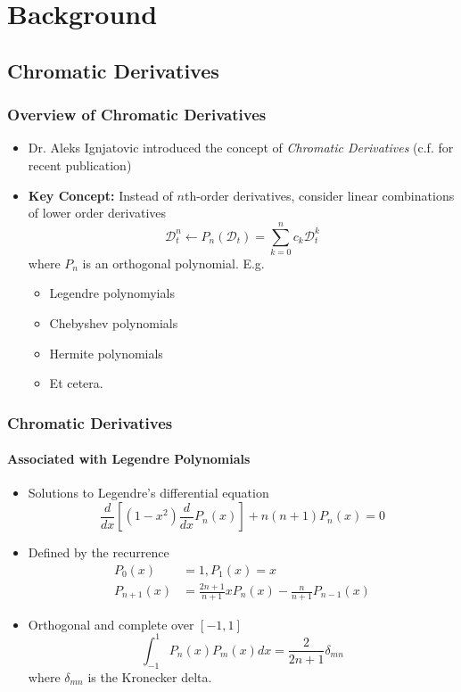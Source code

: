 \documentclass{beamer}
\begin{document}
\section{Background}

\subsection{Chromatic Derivatives}

\begin{frame}
\frametitle{Overview of Chromatic Derivatives}
\begin{itemize}
	\item Dr. Aleks Ignjatovic introduced the concept of \textit{Chromatic Derivatives} 
	(c.f. \cite{Ignjatovic2009} for recent publication)
	\item \textbf{Key Concept:} Instead of $n$th-order derivatives, consider linear 
	combinations of lower order derivatives
	\begin{equation}
		\mathcal{D}_t^n \leftarrow P_n(\mathcal{D}_t) = \sum_{k=0}^{n} c_k \mathcal{D}_t^k
	\end{equation}
	where $P_n$ is an \alert{orthogonal polynomial}. E.g.
	\begin{itemize}
		\item Legendre polynomyials
		\item Chebyshev polynomials
		\item Hermite polynomials
		\item Et cetera.
	\end{itemize}
\end{itemize}
\end{frame}


\begin{frame}
\frametitle{Chromatic Derivatives}
\framesubtitle{Associated with Legendre Polynomials}
\begin{itemize}
\item Solutions to Legendre's differential equation
\begin{equation*}
\frac{d}{dx}\left[(1-x^2)\frac{d}{dx}P_n(x)\right]+n(n+1)P_n(x)=0
\end{equation*}
\item Defined by the recurrence
\begin{align*}
P_0(x) &= 1, P_1(x) = x \\
P_{n+1}(x) &= \frac{2n+1}{n+1}xP_n(x) - \frac{n}{n+1}P_{n-1}(x)
\end{align*}
\item \alert{Orthogonal} and \alert{complete} over $[-1, 1]$
\begin{equation*}
\int_{-1}^{1} P_n(x)P_m(x) dx = \frac{2}{2n+1} \delta_{mn}
\end{equation*}
where $\delta_{mn}$ is the Kronecker delta.
\end{itemize}
\end{frame}
\end{document}
